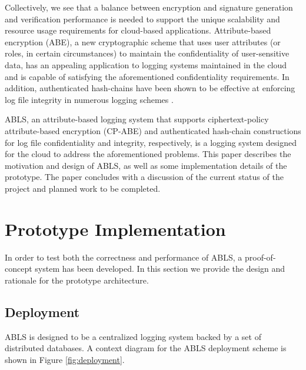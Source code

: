 \documentclass{sig-alternate}
\begin{document}
Collectively, we see that a balance between encryption and signature generation and verification performance is
needed to support the unique scalability and resource usage requirements for cloud-based applications.
Attribute-based encryption (ABE), a new cryptographic scheme that uses user attributes (or roles, in certain 
circumstances) to maintain the confidentiality of user-sensitive data, has an appealing application
to logging systems maintained in the cloud and is capable of satisfying the aforementioned confidentiality 
requirements. In addition, authenticated hash-chains have been shown to be effective at enforcing log file integrity
in numerous logging schemes  \cite{Schneier1999-Secure}. 

ABLS, an attribute-based logging system that supports 
ciphertext-policy attribute-based encryption (CP-ABE) 
\cite{Bethencourt2007-CPABE} and authenticated hash-chain constructions for log file confidentiality and integrity, 
respectively, is a logging system designed for the cloud to address the aforementioned problems. This paper
describes the motivation and design of ABLS, as well as some implementation details of the prototype. The paper
concludes with a discussion of the current status of the project and planned work to be completed.

\section{Prototype Implementation}
In order to test both the correctness and performance of ABLS, a proof-of-concept system has been
developed. In this section we provide the design and rationale for the prototype architecture.

\subsection{Deployment}
\label{sec:deployment}
ABLS is designed to be a centralized logging system backed by a set of distributed databases. A context
diagram for the ABLS deployment scheme is shown in Figure \ref{fig:deployment}.

\end{document}
